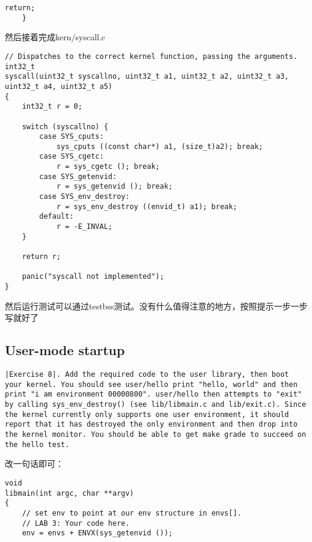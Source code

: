 \documentclass{article}
\begin{document}
\begin{CJK*}{UTF8}{gkai}
\begin{lstlisting}[style=ccode, title={\scriptsize \ttfamily \bfseries kern/trap.c: trap\_dispatch()}]
        return;
    }
\end{lstlisting}

然后接着完成kern/syscall.c

\begin{lstlisting}[style=ccode, title={\scriptsize \ttfamily \bfseries kern/syscall.c: syscall()}]
// Dispatches to the correct kernel function, passing the arguments.
int32_t
syscall(uint32_t syscallno, uint32_t a1, uint32_t a2, uint32_t a3, uint32_t a4, uint32_t a5)
{
    int32_t r = 0;

    switch (syscallno) {
        case SYS_cputs: 
            sys_cputs ((const char*) a1, (size_t)a2); break;              
        case SYS_cgetc: 
            r = sys_cgetc (); break;
        case SYS_getenvid:
            r = sys_getenvid (); break;
        case SYS_env_destroy:
            r = sys_env_destroy ((envid_t) a1); break;
        default:
            r = -E_INVAL;
    }
   
    return r;

    panic("syscall not implemented");
}

\end{lstlisting}

然后运行测试可以通过testbss测试。没有什么值得注意的地方，按照提示一步一步写就好了

\subsection{User-mode startup}

\begin{lstlisting}[style=exercise]
|Exercise 8|. Add the required code to the user library, then boot your kernel. You should see user/hello print "hello, world" and then print "i am environment 00000800". user/hello then attempts to "exit" by calling sys_env_destroy() (see lib/libmain.c and lib/exit.c). Since the kernel currently only supports one user environment, it should report that it has destroyed the only environment and then drop into the kernel monitor. You should be able to get make grade to succeed on the hello test.
\end{lstlisting}

改一句话即可：

\begin{lstlisting}[style=ccode, title={\scriptsize \ttfamily \bfseries lib/libmain.c: libmain()}]
void
libmain(int argc, char **argv)
{
	// set env to point at our env structure in envs[].
	// LAB 3: Your code here.
	env = envs + ENVX(sys_getenvid ());
\end{lstlisting}


\end{CJK*}
\end{document}
